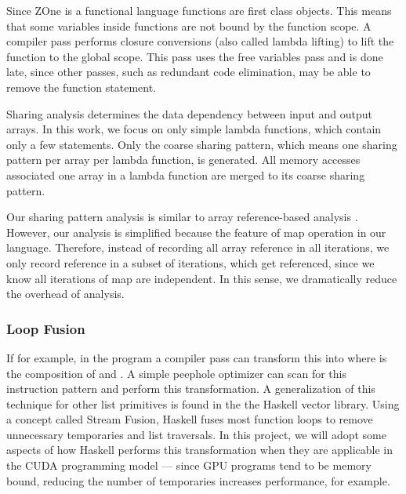 
Since ZOne is a functional language functions are
	first class objects.
This means that some variables inside functions are not
	bound by the function scope.
A compiler pass performs closure conversions (also called
	lambda lifting) to lift the function to the global scope.
This pass uses the free variables pass and is done late,
	since other passes, such as
	redundant code elimination, may be able to remove the
	function statement.



Sharing analysis determines the data dependency between input and output arrays.
In this work, we focus on only simple lambda functions, which contain only a few statements.
Only the coarse sharing pattern, which means one sharing pattern per array per lambda function, is generated.
All memory accesses associated one array in a lambda function are merged to its coarse sharing pattern.

Our sharing pattern analysis is similar to array reference-based analysis \cite{alg_reference}.
However, our analysis is simplified because the feature of map operation in our language.
Therefore, instead of recording all array reference in all iterations, we only record reference in a subset of iterations, which get referenced, 
since we know all iterations of map are independent. 
In this sense, we dramatically reduce the overhead of analysis.


\subsubsection{Loop Fusion}\label{loop-fusion}

If for example, in the program
 a compiler pass can transform this
into  where  is the composition of
 and . A simple peephole optimizer can scan for this
instruction pattern and perform this transformation. A generalization of
this technique for other list primitives is found in the the Haskell
vector library. Using a concept called Stream Fusion\cite{StreamFusion}, Haskell
fuses most function loops to remove unnecessary temporaries and list
traversals. In this project, we will adopt some aspects of how Haskell
performs this transformation when they are applicable in the CUDA
programming model --- since GPU programs tend to be memory bound,
reducing the number of temporaries increases performance, for example.

